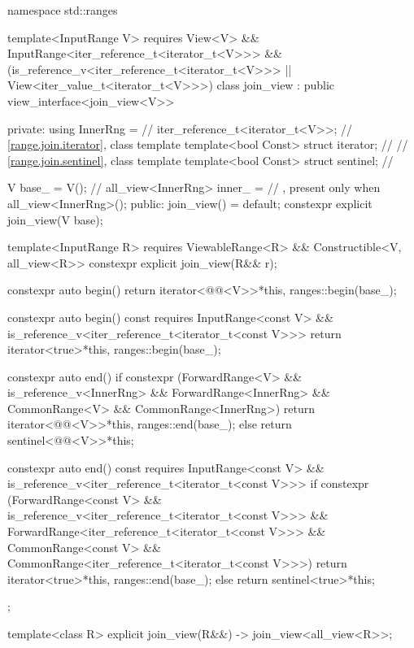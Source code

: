 \begin{codeblock}
namespace std::ranges {
  template<InputRange V>
    requires View<V> && InputRange<iter_reference_t<iterator_t<V>>> &&
             (is_reference_v<iter_reference_t<iterator_t<V>>> ||
              View<iter_value_t<iterator_t<V>>>)
  class join_view : public view_interface<join_view<V>> {
  private:
    using InnerRng =                    // \expos
      iter_reference_t<iterator_t<V>>;
    // \ref{range.join.iterator}, class template 
    template<bool Const>
      struct iterator;                  // \expos
    // \ref{range.join.sentinel}, class template 
    template<bool Const>
      struct sentinel;                  // \expos

    V base_ = V();                      // \expos
    all_view<InnerRng> inner_ =         // \expos, present only when 
      all_view<InnerRng>();
  public:
    join_view() = default;
    constexpr explicit join_view(V base);

    template<InputRange R>
      requires ViewableRange<R> && Constructible<V, all_view<R>>
    constexpr explicit join_view(R&& r);

    constexpr auto begin() {
      return iterator<@@<V>>{*this, ranges::begin(base_)};
    }

    constexpr auto begin() const
    requires InputRange<const V> &&
             is_reference_v<iter_reference_t<iterator_t<const V>>> {
      return iterator<true>{*this, ranges::begin(base_)};
    }

    constexpr auto end() {
      if constexpr (ForwardRange<V> &&
                    is_reference_v<InnerRng> && ForwardRange<InnerRng> &&
                    CommonRange<V> && CommonRange<InnerRng>)
        return iterator<@@<V>>{*this, ranges::end(base_)};
      else
        return sentinel<@@<V>>{*this};
    }

    constexpr auto end() const
    requires InputRange<const V> &&
             is_reference_v<iter_reference_t<iterator_t<const V>>> {
      if constexpr (ForwardRange<const V> &&
                    is_reference_v<iter_reference_t<iterator_t<const V>>> &&
                    ForwardRange<iter_reference_t<iterator_t<const V>>> &&
                    CommonRange<const V> &&
                    CommonRange<iter_reference_t<iterator_t<const V>>>)
        return iterator<true>{*this, ranges::end(base_)};
      else
        return sentinel<true>{*this};
    }
  };

  template<class R>
    explicit join_view(R&&) -> join_view<all_view<R>>;
}
\end{codeblock}

